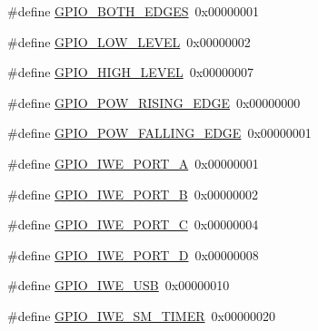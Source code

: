 \begin{DoxyCompactItemize}
\#define \hyperlink{_open_mote-_c_c2538_2source_2gpio_8h_a013dceee7228f3c57c70307cb9622618}{G\+P\+I\+O\+\_\+\+B\+O\+T\+H\+\_\+\+E\+D\+G\+ES}~0x00000001
\item 
\#define \hyperlink{_open_mote-_c_c2538_2source_2gpio_8h_a5d270fc03f8f262730389ccc3af3a53c}{G\+P\+I\+O\+\_\+\+L\+O\+W\+\_\+\+L\+E\+V\+EL}~0x00000002
\item 
\#define \hyperlink{_open_mote-_c_c2538_2source_2gpio_8h_ab147aedbc9403a84e7d5381284bbed1e}{G\+P\+I\+O\+\_\+\+H\+I\+G\+H\+\_\+\+L\+E\+V\+EL}~0x00000007
\item 
\#define \hyperlink{_open_mote-_c_c2538_2source_2gpio_8h_a8a4bb7e2d702f6e1cd7345fe9fd6c674}{G\+P\+I\+O\+\_\+\+P\+O\+W\+\_\+\+R\+I\+S\+I\+N\+G\+\_\+\+E\+D\+GE}~0x00000000
\item 
\#define \hyperlink{_open_mote-_c_c2538_2source_2gpio_8h_abc45d3f0c54e3bcac9a53b4460268442}{G\+P\+I\+O\+\_\+\+P\+O\+W\+\_\+\+F\+A\+L\+L\+I\+N\+G\+\_\+\+E\+D\+GE}~0x00000001
\item 
\#define \hyperlink{_open_mote-_c_c2538_2source_2gpio_8h_ad8851dd419c90b847c270e3fce1045e3}{G\+P\+I\+O\+\_\+\+I\+W\+E\+\_\+\+P\+O\+R\+T\+\_\+A}~0x00000001
\item 
\#define \hyperlink{_open_mote-_c_c2538_2source_2gpio_8h_abda51013707b565740ad07d579c9e39d}{G\+P\+I\+O\+\_\+\+I\+W\+E\+\_\+\+P\+O\+R\+T\+\_\+B}~0x00000002
\item 
\#define \hyperlink{_open_mote-_c_c2538_2source_2gpio_8h_a4ee31a2d728d5fc46b1afc1cf41ea532}{G\+P\+I\+O\+\_\+\+I\+W\+E\+\_\+\+P\+O\+R\+T\+\_\+C}~0x00000004
\item 
\#define \hyperlink{_open_mote-_c_c2538_2source_2gpio_8h_ac792e3e9c5a0d73c6227d93d18cc0cfa}{G\+P\+I\+O\+\_\+\+I\+W\+E\+\_\+\+P\+O\+R\+T\+\_\+D}~0x00000008
\item 
\#define \hyperlink{_open_mote-_c_c2538_2source_2gpio_8h_aa8e53276e68a884438396b00c06b4cc7}{G\+P\+I\+O\+\_\+\+I\+W\+E\+\_\+\+U\+SB}~0x00000010
\item 
\#define \hyperlink{_open_mote-_c_c2538_2source_2gpio_8h_a5b155956c480dafd252e1c4951a74169}{G\+P\+I\+O\+\_\+\+I\+W\+E\+\_\+\+S\+M\+\_\+\+T\+I\+M\+ER}~0x00000020
\end{DoxyCompactItemize}
